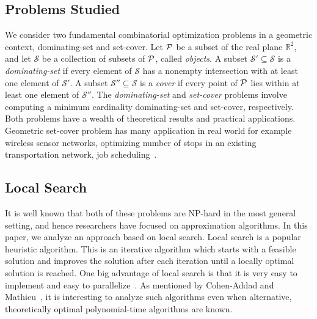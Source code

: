 \documentclass[a4paper,11pt]{article}
\begin{document}
\subsection{Problems Studied}
We consider two fundamental combinatorial optimization problems in a geometric context, dominating-set and set-cover. Let $\cal P$  be a subset of the real plane $\mathbb{R}^2$, and let $\mathscr{S}$ be a collection of subsets of $\cal P$, called \emph{objects}. A subset $\mathscr{S}' \subseteq \mathscr{S}$ is a \emph{dominating-set} if every element of $\mathscr{S}$ has a nonempty intersection with at least one element of $\mathscr{S}'$. A subset $\mathscr{S}'' \subseteq \mathscr{S}$ is a \emph{cover} if every point of $\cal P$ lies within at least one element of $\mathscr{S}''$. The \emph{dominating-set} and \emph{set-cover} problems involve computing a minimum cardinality dominating-set and set-cover, respectively. Both problems have a wealth of theoretical results and practical applications. 
Geometric set-cover 
problem has many application in real world for example wireless sensor 
networks, optimizing number of stops in an existing transportation network, job 
scheduling~\cite{BansalP14,ClarksonV07,HarPel12}.


\subsection{Local Search}
{It is well known that both of these problems are NP-hard in the most general setting, and hence researchers have focused on approximation algorithms. In this paper, we analyze an approach based on local search.}
Local search is a popular heuristic algorithm. This is an iterative  algorithm 
which starts with a feasible solution and improves the solution after each 
iteration until a locally optimal solution is reached. One big advantage of 
local search  is that it is very easy to implement and  easy to 
parallelize~\cite{Cohen-AddadM15}. As mentioned by Cohen-Addad and 
Mathieu~\cite{Cohen-AddadM15}, it is interesting to analyze such algorithms 
even when  alternative, theoretically optimal polynomial-time algorithms are 
known. 
\end{document}
